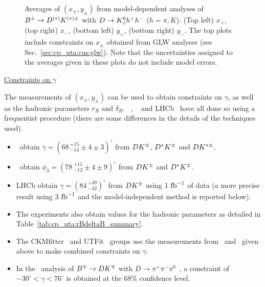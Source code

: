 \begin{figure}[htbp]
\begin{center}
{    }
  \end{center}
  \vspace{-0.8cm}
  \caption{
    Averages of $(x_\pm, y_\pm)$ from model-dependent analyses of $B^\pm \to
    D^{(*)}K^{(*)\pm}$ with $D \to K^0_{\scriptscriptstyle S} h^+h^-$ ($h=\pi,K$).
    (Top left) $x_+$, (top right) $x_-$,
    (bottom left) $y_+$, (bottom right) $y_-$.
    The top plots include constraints on $x_{\pm}$ obtained from GLW analyses (see Sec.~\ref{sec:cp_uta:cus:glw}).
    Note that the uncertainties assigned to the averages given in these plots
    do not include model errors.        
  }
  \label{fig:cp_uta:cus:dalitz_1d}
\end{figure}

\vspace{3ex}

\noindent
\underline{Constraints on $\gamma$}

The measurements of $(x_\pm, y_\pm)$ can be used to obtain constraints on 
$\gamma$, as well as the hadronic parameters $r_B$ and $\delta_B$.
\babar~\cite{delAmoSanchez:2010rq},
\belle~\cite{Poluektov:2010wz,Poluektov:2006ia} and
LHCb~\cite{Aaij:2014iba}
have all done so using a frequentist procedure 
(there are some differences in the details of the techniques used).

\begin{itemize}\setlength{\itemsep}{0.5ex}

\item 
  \babar\ obtain $\gamma = (68 \,^{+15}_{-14} \pm 4 \pm 3)^\circ$
  from $DK^\pm$, $D^*K^\pm$ and $DK^{*\pm}$.

\item
  \belle\ obtain $\phi_3 = (78 \,^{+11}_{-12} \pm 4 \pm 9)^\circ$
  from $DK^\pm$ and $D^*K^\pm$.

\item 
  LHCb obtain $\gamma = (84 \,^{+49}_{-42})^\circ$
  from $DK^\pm$ using 1 ${\rm fb}^{-1}$ of data (a more precise result using 3 ${\rm fb}^{-1}$ and the model-independent method is reported below).

\item
  The experiments also obtain values for the hadronic parameters as detailed
  in Table~\ref{tab:cp_uta:rBdeltaB_summary}.


\item 
  The CKMfitter~\cite{Charles:2004jd} and 
  UTFit~\cite{Bona:2005vz} groups use the measurements 
  from \belle\ and \babar\ given above
  to make combined constraints on $\gamma$.

\item 
  In the \babar\ analysis of $B^\mp \to DK^\mp$ with 
  $D \to \pi^+\pi^-\pi^0$~\cite{Aubert:2007ii},
  a constraint of $-30^\circ < \gamma < 76^\circ$ is obtained 
  at the 68\% confidence level.

\end{itemize}

